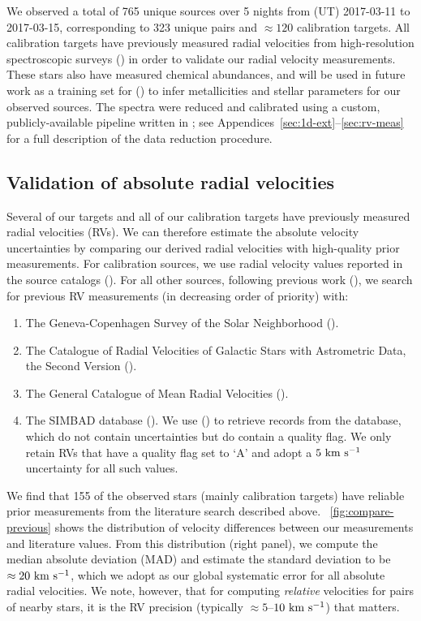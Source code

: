 \documentclass[modern, letterpaper]{aastex61}
\begin{document}
We observed a total of 765 unique sources over 5 nights from (UT) 2017-03-11 to
2017-03-15, corresponding to 323 unique pairs and $\approx 120$
calibration targets.
All calibration targets have previously measured radial velocities from
high-resolution spectroscopic surveys (\citealt{Bensby:2014,Pinsonneault:2014})
in order to validate our radial velocity measurements.
These stars also have measured chemical abundances, and will be used in future
work as a training set for  (\citealt{Ness:2015}) to infer
metallicities and stellar parameters for our observed sources.
The spectra were reduced and calibrated using a custom, publicly-available
pipeline written in \python; see Appendices~\ref{sec:1d-ext}--\ref{sec:rv-meas}
for a full description of the data reduction procedure.

\subsection{Validation of absolute radial velocities}\label{sec:rv-validation}

Several of our targets and all of our calibration targets have previously
measured radial velocities (RVs).
We can therefore estimate the absolute velocity uncertainties by comparing our
derived radial velocities with high-quality prior measurements.
For calibration sources, we use radial velocity values reported in the source
catalogs (\citealt{Bensby:2014,Pinsonneault:2014}).
For all other sources, following previous work (\citealt{Shaya:2011}), we search
for previous RV measurements (in decreasing order of priority) with:
\begin{enumerate}
  \item The Geneva-Copenhagen Survey of the Solar Neighborhood
  (\citealt{Nordstrom:2004}).
  \item The Catalogue of Radial Velocities of Galactic Stars with Astrometric
  Data, the Second Version (\citealt{Kharchenko:2007}).
  \item The General Catalogue of Mean Radial Velocities
  (\citealt{Barbier-Brossat:2000}).
  \item The SIMBAD database (\citealt{Wenger:2000}). We use 
  (\citealt{Ginsburg:2016}) to retrieve records from the database, which do not
  contain uncertainties but do contain a quality flag. We only retain RVs that
  have a quality flag set to `A' and adopt a $5~\mathrm{km}~\mathrm{s}^{-1}$ uncertainty for all such
  values.
\end{enumerate}
We find that 155 of the observed stars (mainly calibration targets) have
reliable prior measurements from the literature search described above.
\figurename~\ref{fig:compare-previous} shows the distribution of velocity
differences between our measurements and literature values.
From this distribution (right panel), we compute the median absolute deviation
(MAD) and estimate the standard deviation to be $\approx 20~\mathrm{km}~\mathrm{s}^{-1}$, which we
adopt as our global systematic error for all absolute radial velocities.
We note, however, that for computing \emph{relative} velocities for pairs of
nearby stars, it is the RV precision (typically $\approx 5$--$10~\mathrm{km}~\mathrm{s}^{-1}$) that
matters.
\end{document}
